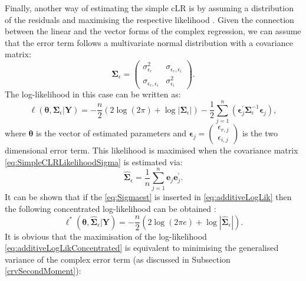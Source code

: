 \documentclass[
]{book}
\begin{document}
Finally, another way of estimating the simple cLR is by assuming a distribution of the residuals and maximising the respective likelihood \citep{VandenBos1994}. Given the connection between the linear and the vector forms of the complex regression, we can assume that the error term follows a multivariate normal distribution with a covariance matrix:
\begin{equation}
    \boldsymbol{\Sigma}_\epsilon = \begin{pmatrix} \sigma_{\epsilon_r}^2 & \sigma_{\epsilon_r, \epsilon_i} \\ \sigma_{\epsilon_r, \epsilon_i} & \sigma_{\epsilon_i}^2 \end{pmatrix} .
    \label{eq:SimpleCLRLikelihoodSigma}
\end{equation}
The log-likelihood in this case can be written as:
\begin{equation}
    \ell(\boldsymbol{\theta}, \boldsymbol{\Sigma}_\epsilon | \mathbf{Y}) = -\frac{n}{2} \left( 2 \log(2 \pi) + \log | \boldsymbol{\Sigma}_\epsilon| \right) -\frac{1}{2} \sum_{j=1}^n \left( \boldsymbol{\epsilon}_j^\prime \boldsymbol{\Sigma}_\epsilon^{-1} \boldsymbol{\epsilon}_j \right) ,
    \label{eq:additiveLogLik}
\end{equation}
where \(\boldsymbol{\theta}\) is the vector of estimated parameters and \(\boldsymbol{\epsilon}_j = \begin{pmatrix} \epsilon_{r,j} \\ \epsilon_{i,j} \end{pmatrix}\) is the two dimensional error term. This likelihood is maximised when the covariance matrix \eqref{eq:SimpleCLRLikelihoodSigma} is estimated via:
\begin{equation}
    \hat{\boldsymbol{\Sigma}}_\epsilon = \frac{1}{n} \sum_{j=1}^{n} \boldsymbol{e}_j \boldsymbol{e}_j^\prime .
    \label{eq:Sigmaest}
\end{equation}
It can be shown that if the \eqref{eq:Sigmaest} is inserted in \eqref{eq:additiveLogLik} then the following concentrated log-likelihood can be obtained \citep[see, for example,][]{Snyder2017}:
\begin{equation}
    \ell^*(\boldsymbol{\theta}, \hat{\boldsymbol{\Sigma}}_\epsilon | \mathbf{Y}) = -\frac{n}{2} \left( 2 \log(2 \pi e) + \log | \hat{\boldsymbol{\Sigma}}_\epsilon | \right) .
    \label{eq:additiveLogLikConcentrated}
\end{equation}
It is obvious that the maximisation of the log-likelihood \eqref{eq:additiveLogLikConcentrated} is equivalent to minimising the generalised variance of the complex error term (as discussed in Subsection \ref{crvSecondMoment}):
\end{document}
